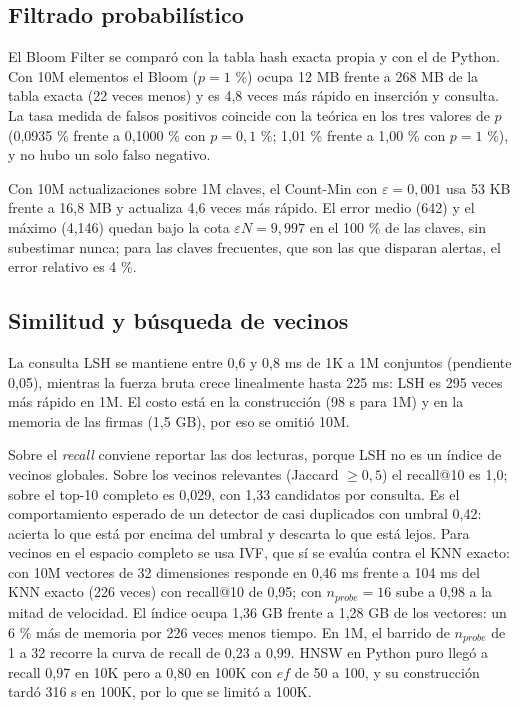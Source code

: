\documentclass[11pt,letterpaper]{article}
\newcommand{\code}[1]{\texttt{\detokenize{#1}}}
\begin{document}
\subsection{Filtrado probabil\'istico}
El Bloom Filter se compar\'o con la tabla hash exacta propia y con el \code{set} de Python. Con 10M elementos el Bloom ($p=1$ \%) ocupa 12 MB frente a 268 MB de la tabla exacta (22 veces menos) y es 4,8 veces m\'as r\'apido en inserci\'on y consulta. La tasa medida de falsos positivos coincide con la te\'orica en los tres valores de $p$ (0,0935 \% frente a 0,1000 \% con $p=0{,}1$ \%; 1,01 \% frente a 1,00 \% con $p=1$ \%), y no hubo un solo falso negativo.


Con 10M actualizaciones sobre 1M claves, el Count-Min con $\varepsilon=0{,}001$ usa 53 KB frente a 16,8 MB y actualiza 4,6 veces m\'as r\'apido. El error medio (642) y el m\'aximo (4,146) quedan bajo la cota $\varepsilon N = 9,997$ en el 100 \% de las claves, sin subestimar nunca; para las claves frecuentes, que son las que disparan alertas, el error relativo es 4 \%.

\subsection{Similitud y b\'usqueda de vecinos}
\label{sec:similitud}
La consulta LSH se mantiene entre 0,6 y 0,8 ms de 1K a 1M conjuntos (pendiente 0,05), mientras la fuerza bruta crece linealmente hasta 225 ms: LSH es 295 veces m\'as r\'apido en 1M. El costo est\'a en la construcci\'on (98 s para 1M) y en la memoria de las firmas (1,5 GB), por eso se omiti\'o 10M.

Sobre el \emph{recall} conviene reportar las dos lecturas, porque LSH no es un \'indice de vecinos globales. Sobre los vecinos relevantes (Jaccard $\ge 0{,}5$) el recall@10 es 1,0; sobre el top-10 completo es 0,029, con 1,33 candidatos por consulta. Es el comportamiento esperado de un detector de casi duplicados con umbral 0,42: acierta lo que est\'a por encima del umbral y descarta lo que est\'a lejos. Para vecinos en el espacio completo se usa IVF, que s\'i se eval\'ua contra el KNN exacto: con 10M vectores de 32 dimensiones responde en 0,46 ms frente a 104 ms del KNN exacto (226 veces) con recall@10 de 0,95; con $n_{probe}=16$ sube a 0,98 a la mitad de velocidad. El \'indice ocupa 1,36 GB frente a 1,28 GB de los vectores: un 6 \% m\'as de memoria por 226 veces menos tiempo. En 1M, el barrido de $n_{probe}$ de 1 a 32 recorre la curva de recall de 0,23 a 0,99. HNSW en Python puro lleg\'o a recall 0,97 en 10K pero a 0,80 en 100K con $ef$ de 50 a 100, y su construcci\'on tard\'o 316 s en 100K, por lo que se limit\'o a 100K.
\end{document}
